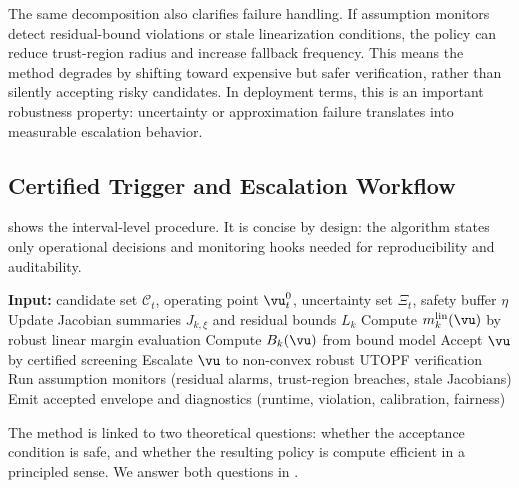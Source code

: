 \documentclass{article} %
\begin{document}
The same decomposition also clarifies failure handling. If assumption monitors detect residual-bound violations or stale linearization conditions, the policy can reduce trust-region radius and increase fallback frequency. This means the method degrades by shifting toward expensive but safer verification, rather than silently accepting risky candidates. In deployment terms, this is an important robustness property: uncertainty or approximation failure translates into measurable escalation behavior.

\subsection{Certified Trigger and Escalation Workflow}
 shows the interval-level procedure. It is concise by design: the algorithm states only operational decisions and monitoring hooks needed for reproducibility and auditability.

\begin{algorithm}[t]
\caption{Certified hybrid RDOE interval update with auditable screening and fallback verification. The workflow emphasizes where safety certification is evaluated, where escalation occurs, and where diagnostics are logged for reproducibility.}
\label{alg:certified}
\begin{algorithmic}[1]
\STATE \textbf{Input:} candidate set $\mathcal{C}_t$, operating point $\vu_t^0$, uncertainty set $\Xi_t$, safety buffer $\eta$
\STATE Update Jacobian summaries $J_{k,\xi}$ and residual bounds $L_k$
  \STATE Compute $m_k^{\mathrm{lin}}(\vu)$ by robust linear margin evaluation
  \STATE Compute $B_k(\vu)$ from bound model
    \STATE Accept $\vu$ by certified screening
  \ELSE
    \STATE Escalate $\vu$ to non-convex robust UTOPF verification
  \ENDIF
\ENDFOR
\STATE Run assumption monitors (residual alarms, trust-region breaches, stale Jacobians)
\STATE Emit accepted envelope and diagnostics (runtime, violation, calibration, fairness)
\end{algorithmic}
\end{algorithm}

The method is linked to two theoretical questions: whether the acceptance condition is safe, and whether the resulting policy is compute efficient in a principled sense. We answer both questions in .
\end{document}
